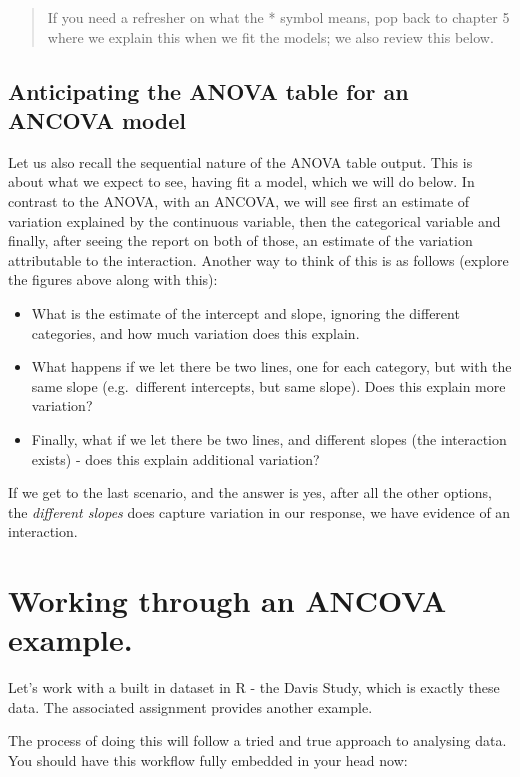 \documentclass[
]{book}
\providecommand{\tightlist}{%
  \setlength{\itemsep}{0pt}\setlength{\parskip}{0pt}}
\begin{document}
\begin{quote}
If you need a refresher on what the * symbol means, pop back to chapter 5 where we explain this when we fit the models; we also review this below.
\end{quote}

\subsection{Anticipating the ANOVA table for an ANCOVA model}\label{anticipating-the-anova-table-for-an-ancova-model}

Let us also recall the sequential nature of the ANOVA table output. This is about what we expect to see, having fit a model, which we will do below. In contrast to the ANOVA, with an ANCOVA, we will see first an estimate of variation explained by the continuous variable, then the categorical variable and finally, after seeing the report on both of those, an estimate of the variation attributable to the interaction. Another way to think of this is as follows (explore the figures above along with this):

\begin{itemize}
\tightlist
\item
  What is the estimate of the intercept and slope, ignoring the different categories, and how much variation does this explain.
\item
  What happens if we let there be two lines, one for each category, but with the same slope (e.g.~different intercepts, but same slope). Does this explain more variation?
\item
  Finally, what if we let there be two lines, and different slopes (the interaction exists) - does this explain additional variation?
\end{itemize}

If we get to the last scenario, and the answer is yes, after all the other options, the \emph{different slopes} does capture variation in our response, we have evidence of an interaction.

\section{Working through an ANCOVA example.}\label{working-through-an-ancova-example.}

Let's work with a built in dataset in R - the Davis Study, which is exactly these data. The associated assignment provides another example.

The process of doing this will follow a tried and true approach to analysing data. You should have this workflow fully embedded in your head now:
\end{document}
